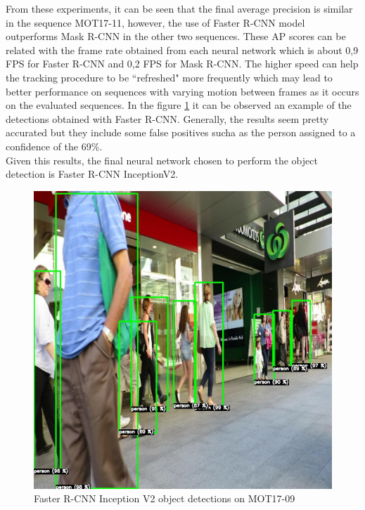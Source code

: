 From these experiments, it can be seen that the final average precision is similar in the sequence MOT17-11, however, the use of Faster R-CNN model outperforms Mask R-CNN in the other two sequences. These AP scores can be related with the frame rate obtained from each neural network which is about 0,9 FPS for Faster R-CNN and 0,2 FPS for Mask R-CNN. The higher speed can help the tracking procedure to be ``refreshed" more frequently which may lead to better performance on sequences with varying motion between frames as it occurs on the evaluated sequences. In the figure \ref{fig:faster_dets} it can be observed an example of the detections obtained with Faster R-CNN. Generally, the results seem pretty accurated but they include some false positives sucha as the person assigned to a confidence of the 69\%.\\
Given this results, the final neural network chosen to perform the object detection is Faster R-CNN InceptionV2.
\begin{figure}[H]
\begin{center}
\includegraphics[scale=0.2]{figures/212.jpg}
\caption{Faster R-CNN Inception V2 object detections on MOT17-09}
\label{fig:faster_dets}
\end{center}
\end{figure}
